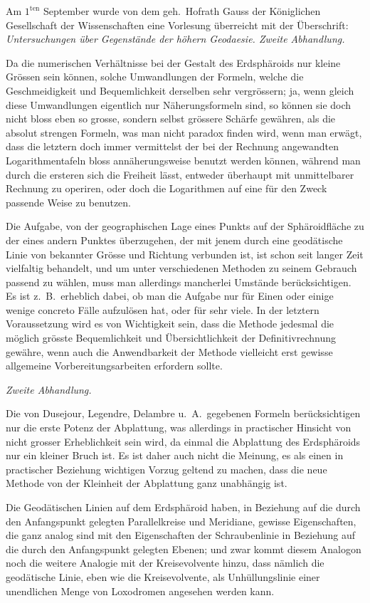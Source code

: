 \documentclass[fontsize=10pt,paper=a5,pagesize,headings=small,headinclude=true,footinclude=true]{scrbook}
\begin{document}
Am $1^{\text{ten}}$ September wurde von dem geh.~Hofrath Gauss der Königlichen Gesellschaft der Wissenschaften eine Vorlesung überreicht mit der Überschrift: \textit{Untersuchungen über Gegenstände der höhern Geodaesie. Zweite Abhandlung.}

Da die numerischen Verhältnisse bei der Gestalt des Erdsphäroids nur kleine Grössen sein können, solche Umwandlungen der Formeln, welche die Geschmeidigkeit und Bequemlichkeit derselben sehr vergrössern; ja, wenn gleich diese Umwandlungen eigentlich nur Näherungsformeln sind, so können sie doch nicht bloss eben so grosse, sondern selbst grössere Schärfe gewähren, als die absolut strengen Formeln, was man nicht paradox finden wird, wenn man erwägt, dass die letztern doch immer vermittelst der bei der Rechnung angewandten Logarithmentafeln bloss annäherungsweise benutzt werden können, während man durch die ersteren sich die Freiheit lässt, entweder überhaupt mit unmittelbarer Rechnung zu operiren, oder doch die Logarithmen auf eine für den Zweck passende Weise zu benutzen.

Die Aufgabe, von der geographischen Lage eines Punkts auf der Sphäroidfläche zu der eines andern Punktes überzugehen, der mit jenem durch eine geodätische Linie von bekannter Grösse und Richtung verbunden ist, ist schon seit langer Zeit vielfaltig behandelt, und um unter verschiedenen Methoden zu seinem Gebrauch passend zu wählen, muss man allerdings mancherlei Umstände berücksichtigen. Es ist z.~B.~erheblich dabei, ob man die Aufgabe nur für Einen oder einige wenige concreto Fälle aufzulösen hat, oder für sehr viele. In der letztern Voraussetzung wird es von Wichtigkeit sein, dass die Methode jedesmal die möglich grösste Bequemlichkeit und Übersichtlichkeit der Definitivrechnung gewähre, wenn auch die Anwendbarkeit der Methode vielleicht erst gewisse allgemeine Vorbereitungsarbeiten erfordern sollte.

\textit{Zweite Abhandlung.}

Die von Dusejour, Legendre, Delambre u.~A.~gegebenen Formeln berücksichtigen nur die erste Potenz der Abplattung, was allerdings in practischer Hinsicht von nicht grosser Erheblichkeit sein wird, da einmal die Abplattung des Erdsphäroids nur ein kleiner Bruch ist. Es ist daher auch nicht die Meinung, es als einen in practischer Beziehung wichtigen Vorzug geltend zu machen, dass die neue Methode von der Kleinheit der Abplattung ganz unabhängig ist.

Die Geodätischen Linien auf dem Erdsphäroid haben, in Beziehung auf die durch den Anfangspunkt gelegten Parallelkreise und Meridiane, gewisse Eigenschaften, die ganz analog sind mit den Eigenschaften der Schraubenlinie in Beziehung auf die durch den Anfangspunkt gelegten Ebenen; und zwar kommt diesem Analogon noch die weitere Analogie mit der Kreisevolvente hinzu, dass nämlich die geodätische Linie, eben wie die Kreisevolvente, als Unhüllungslinie einer unendlichen Menge von Loxodromen angesehen werden kann.
\end{document}
